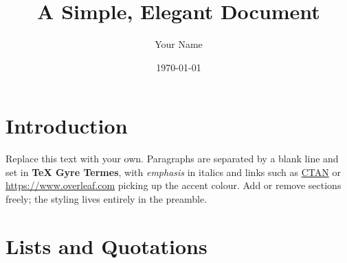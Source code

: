
\renewenvironment{quote}
  {\def\FrameCommand{\hspace{0.2em}{\color{Accent}\vrule width 1.4pt}\hspace{1em}}%
   \MakeFramed{\advance\hsize-\width \FrameRestore}\itshape}
  {\endMakeFramed}
\let\quotation\quote
\let\endquotation\endquote


\usepackage[colorlinks=true,linkcolor=Accent,citecolor=Accent,urlcolor=Accent]{hyperref}

\title{A Simple, Elegant Document}
\author{Your Name}
\date{\today}



\maketitle

\section{Introduction}
Replace this text with your own. Paragraphs are separated by a blank line and
set in \textbf{TeX Gyre Termes}, with \emph{emphasis} in italics and links such
as \href{https://www.ctan.org}{CTAN} or \url{https://www.overleaf.com} picking
up the accent colour. Add or remove sections freely; the styling lives entirely
in the preamble.

\section{Lists and Quotations}
